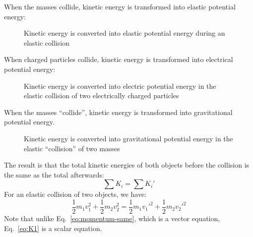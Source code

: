 When the masses collide, kinetic energy is transformed into elastic potential
energy:
\begin{figure}[ht]
  \centering
  \caption{Kinetic energy is converted into elastic potential energy during an
    elastic collision}
\end{figure}
When charged particles collide, kinetic energy is transformed into electrical
potential energy:
\begin{figure}[t]
  \centering
  \caption{Kinetic energy is converted into electric potential energy in the
  elastic collision of two electrically charged particles}
\end{figure}
When the masses ``collide'', kinetic energy is transformed into gravitational
potential energy.
\begin{figure}[t]
  \centering
  \caption{Kinetic energy is converted into gravitational potential energy in
    the elastic ``collision'' of two masses}
\end{figure}

The result is that the total kinetic energies of both objects before the
collision is the same as the total afterwards:
\begin{equation}
  \sum K_i = \sum K_i'
\end{equation}
For an elastic collision of two objects, we have:
\begin{equation}
  \frac12m_1v_1^2 + \frac12m_2v_2^2 = \frac12m_1v_1'^2+\frac12 m_2v_2'^2
  \label{eq:K1}
\end{equation}
Note that unlike Eq.~\ref{eq:momentum-same}, which is a vector equation,
Eq.~\ref{eq:K1} is a scalar equation.


